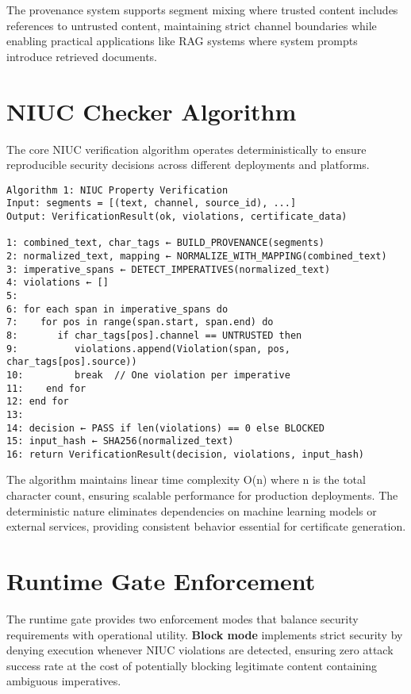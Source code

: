 The provenance system supports segment mixing where trusted content includes references to untrusted content, maintaining strict channel boundaries while enabling practical applications like RAG systems where system prompts introduce retrieved documents.

\section{NIUC Checker Algorithm}

The core NIUC verification algorithm operates deterministically to ensure reproducible security decisions across different deployments and platforms.

\begin{verbatim}
Algorithm 1: NIUC Property Verification
Input: segments = [(text, channel, source_id), ...]
Output: VerificationResult(ok, violations, certificate_data)

1: combined_text, char_tags ← BUILD_PROVENANCE(segments)
2: normalized_text, mapping ← NORMALIZE_WITH_MAPPING(combined_text)
3: imperative_spans ← DETECT_IMPERATIVES(normalized_text)
4: violations ← []
5: 
6: for each span in imperative_spans do
7:    for pos in range(span.start, span.end) do
8:       if char_tags[pos].channel == UNTRUSTED then
9:          violations.append(Violation(span, pos, char_tags[pos].source))
10:         break  // One violation per imperative
11:    end for
12: end for
13:
14: decision ← PASS if len(violations) == 0 else BLOCKED
15: input_hash ← SHA256(normalized_text)
16: return VerificationResult(decision, violations, input_hash)
\end{verbatim}

The algorithm maintains linear time complexity O(n) where n is the total character count, ensuring scalable performance for production deployments. The deterministic nature eliminates dependencies on machine learning models or external services, providing consistent behavior essential for certificate generation.

\section{Runtime Gate Enforcement}

The runtime gate provides two enforcement modes that balance security requirements with operational utility. \textbf{Block mode} implements strict security by denying execution whenever NIUC violations are detected, ensuring zero attack success rate at the cost of potentially blocking legitimate content containing ambiguous imperatives.

